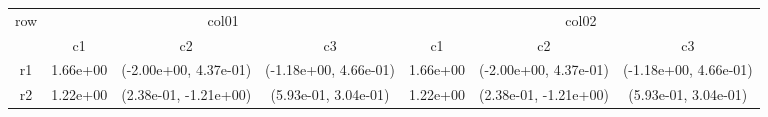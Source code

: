 \begin{tabular}{ccccccc}
\toprule
\multirow{2}{*}{row}&\multicolumn{3}{c}{col01}&\multicolumn{3}{c}{col02}\tabularnewline
\cmidrule(lr){2-4}
\cmidrule(lr){5-7}
&c1&c2&c3&c1&c2&c3\tabularnewline
\midrule
r1&1.66e+00& (-2.00e+00, 4.37e-01)& (-1.18e+00, 4.66e-01)&1.66e+00& (-2.00e+00, 4.37e-01)& (-1.18e+00, 4.66e-01)\tabularnewline
r2&1.22e+00& (2.38e-01, -1.21e+00)& (5.93e-01, 3.04e-01)&1.22e+00& (2.38e-01, -1.21e+00)& (5.93e-01, 3.04e-01)\tabularnewline
\bottomrule
\end{tabular}
